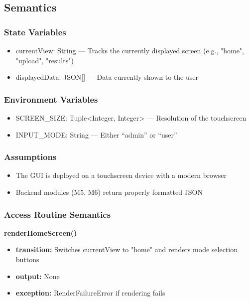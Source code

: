 \documentclass[12pt, titlepage]{article}
\begin{document}
\subsection*{Semantics}

\subsubsection*{State Variables}

\begin{itemize}
  \item currentView: String — Tracks the currently displayed screen (e.g., "home", "upload", "results")
  \item displayedData: JSON[] — Data currently shown to the user
\end{itemize}

\subsubsection*{Environment Variables}

\begin{itemize}
  \item SCREEN\_SIZE: Tuple<Integer, Integer> — Resolution of the touchscreen
  \item INPUT\_MODE: String — Either ``admin'' or ``user''
\end{itemize}

\subsubsection*{Assumptions}

\begin{itemize}
  \item The GUI is deployed on a touchscreen device with a modern browser
  \item Backend modules (M5, M6) return properly formatted JSON
\end{itemize}

\subsubsection*{Access Routine Semantics}

\noindent \textbf{renderHomeScreen()}
\begin{itemize}
  \item \textbf{transition:} Switches currentView to "home" and renders mode selection buttons
  \item \textbf{output:} None
  \item \textbf{exception:} RenderFailureError if rendering fails
\end{itemize}
\end{document}

